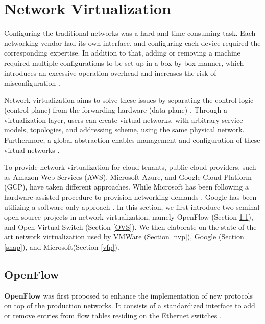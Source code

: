 \section{Network Virtualization}


Configuring the traditional networks was a hard and time-consuming task. Each networking 
vendor had its own interface, and configuring each device required the corresponding 
expertise. In addition to that, adding or removing a machine required multiple configurations 
to be set up in a box-by-box manner, which introduces an excessive operation overhead and 
increases the risk of misconfiguration \cite{cearley2013top, marty2019snap}.

Network virtualization aims to solve these issues by separating the control logic 
(control-plane) from the forwarding hardware (data-plane) \cite{koponen2014network, 
caesar2005design, casado2007ethane, gude2008nox, koponen2010onix, mckeown2008openflow}. 
Through a virtualization layer, users can create virtual networks, with arbitrary service 
models, topologies, and addressing scheme, using the same physical network. Furthermore, 
a global abstraction enables management and configuration of these virtual networks 
\cite{mckeown2008openflow}.

To provide network virtualization for cloud tenants, public cloud providers, such as Amazon 
Web Services (AWS), Microsoft Azure, and Google Cloud Platform (GCP), have taken different 
approaches. While Microsoft has been following a hardware-assisted procedure to provision 
networking demands \cite{firestone2018azure, firestone2017vfp}, Google has been utilizing 
a software-only approach \cite{marty2019snap}. In this section, we first introduce two seminal 
open-source projects in network virtualization, namely OpenFlow (Section \ref{OpenFlow}), 
and Open Virtual Switch (Section \ref{OVS}). We then elaborate on the state-of-the art network 
virtualization used by VMWare (Section \ref{nvp}), Google (Section \ref{snap}), and 
Microsoft(Section \ref{vfp}).

\subsection{OpenFlow}
\label{OpenFlow}
\textbf{OpenFlow} was first proposed to enhance the implementation of new protocols on top 
of the production networks. It consists of a standardized interface to add or remove entries 
from flow tables residing on the Ethernet switches \cite{mckeown2008openflow}.

